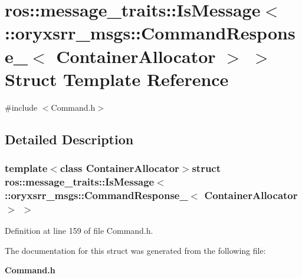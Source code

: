 \section{ros\-:\-:message\-\_\-traits\-:\-:\-Is\-Message$<$ \-:\-:oryxsrr\-\_\-msgs\-:\-:\-Command\-Response\-\_\-$<$ \-Container\-Allocator $>$ $>$ \-Struct \-Template \-Reference}
\label{structros_1_1message__traits_1_1IsMessage_3_01_1_1oryxsrr__msgs_1_1CommandResponse___3_01ContainerAllocator_01_4_01_4}


{\ttfamily \#include $<$\-Command.\-h$>$}



\subsection{\-Detailed \-Description}
\subsubsection*{template$<$class Container\-Allocator$>$struct ros\-::message\-\_\-traits\-::\-Is\-Message$<$ \-::oryxsrr\-\_\-msgs\-::\-Command\-Response\-\_\-$<$ Container\-Allocator $>$ $>$}



\-Definition at line 159 of file \-Command.\-h.



\-The documentation for this struct was generated from the following file\-:\begin{DoxyCompactItemize}
\item 
{\bf \-Command.\-h}\end{DoxyCompactItemize}
